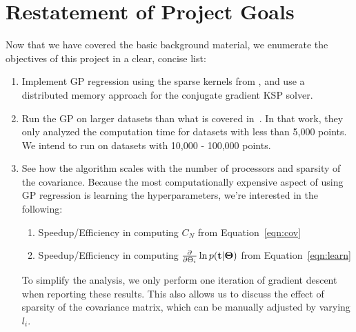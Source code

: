 \section{Restatement of Project Goals}
\label{sec:restatementofprojectgoals}

Now that we have covered the basic background material, we enumerate the objectives of
this project in a clear, concise list:
\begin{enumerate}
\item{Implement \ac{GP} regression using the sparse kernels from
    \cite{melkumyan2009sparse}, and use a distributed memory approach for the conjugate
    gradient \ac{KSP} solver.}
\item{Run the \ac{GP} on larger datasets than what is covered
    in~\cite{melkumyan2009sparse}.  In that work, they only analyzed the computation time
    for datasets with less than 5,000 points.  We intend to run on datasets with 10,000 - 100,000 points.}
\item{See how the algorithm scales with the number of processors and sparsity of the
    covariance.  Because the most computationally expensive aspect of using \ac{GP}
    regression is learning the hyperparameters, we're interested in the following:}
  \begin{enumerate}
  \item{Speedup/Efficiency in computing $C_N$ from Equation~\ref{eqn:cov}}
  \item{Speedup/Efficiency in computing $\frac{\partial}{\partial \Theta_i} \ln p({\bf
        t}|{\boldsymbol \Theta})$ from Equation~\ref{eqn:learn}}
  \end{enumerate}
  To simplify the analysis, we only perform one iteration of gradient descent when
  reporting these results.  This also allows us to discuss the effect of sparsity of
  the covariance matrix, which can be manually adjusted by varying $l_i$.
\end{enumerate}

